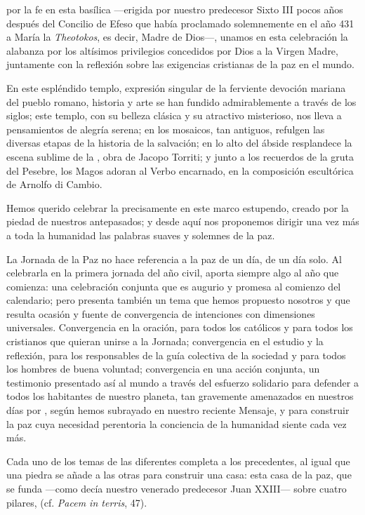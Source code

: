 \begin{body}
	 por la fe en esta basílica ---erigida por nuestro predecesor Sixto III pocos años después del Concilio de Efeso que había proclamado solemnemente en el año 431 a María la \emph{Theotokos}, es decir, Madre de Dios---, unamos en esta celebración la alabanza por los altísimos privilegios concedidos por Dios a la Virgen Madre, juntamente con la reflexión sobre las exigencias cristianas de la paz en el mundo.
	
	En este espléndido templo, expresión singular de la ferviente devoción mariana del pueblo romano, historia y arte se han fundido admirablemente a través de los siglos; este templo, con su belleza clásica y su atractivo misterioso, nos lleva a pensamientos de alegría serena; en los mosaicos, tan antiguos, refulgen las diversas etapas de la historia de la salvación; en lo alto del ábside resplandece la escena sublime de la , obra de Jacopo Torriti; y junto a los recuerdos de la gruta del Pesebre, los Magos adoran al Verbo encarnado, en la composición escultórica de Arnolfo di Cambio.
	
	Hemos querido celebrar la  precisamente en este marco estupendo, creado por la piedad de nuestros antepasados; y desde aquí nos proponemos dirigir una vez más a toda la humanidad las palabras suaves y solemnes de la paz.
	
	La Jornada de la Paz no hace referencia a la paz de un día, de un día solo. Al celebrarla en la primera jornada del año civil, aporta siempre algo al año que comienza: una celebración conjunta que es augurio y promesa al comienzo del calendario; pero presenta también un tema que hemos propuesto nosotros y que resulta ocasión y fuente de convergencia de intenciones con dimensiones universales. Convergencia en la oración, para todos los católicos y para todos los cristianos que quieran unirse a la Jornada; convergencia en el estudio y la reflexión, para los responsables de la guía colectiva de la sociedad y para todos los hombres de buena voluntad; convergencia en una acción conjunta, un testimonio presentado así al mundo a través del esfuerzo solidario para defender a todos los habitantes de nuestro planeta, tan gravemente amenazados en nuestros días por , según hemos subrayado en nuestro reciente Mensaje, y para construir la paz cuya necesidad perentoria la conciencia de la humanidad siente cada vez más.
	
	Cada uno de los temas de las diferentes  completa a los precedentes, al igual que una piedra se añade a las otras para construir una casa: esta casa de la paz, que se funda ---como decía nuestro venerado predecesor Juan XXIII--- sobre cuatro pilares,  (cf. \emph{Pacem in terris}, 47).
	

\end{body}
